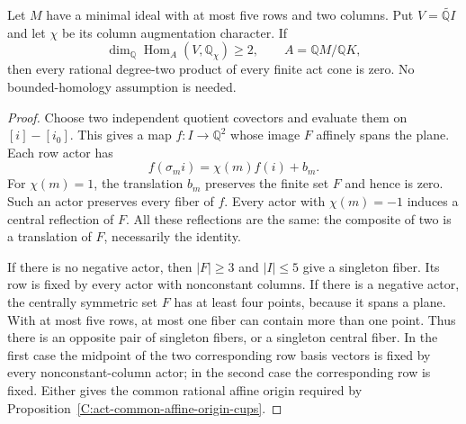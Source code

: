 \begin{lemma}
\label{C:two-covector-affine-origin}
Let $M$ have a minimal ideal with at most five rows and two
columns.  Put $V=\widetilde{\mathbb QI}$ and let $\chi$ be its
column augmentation character.  If
\[
 \dim_{\mathbb Q}\operatorname{Hom}_A(V,\mathbb Q_\chi)\geq2,
 \qquad A=\mathbb QM/\mathbb QK,
\]
then every rational degree-two product of every finite act
cone is zero.  No bounded-homology assumption is needed.
\end{lemma}
\begin{proof}
Choose two independent quotient covectors and evaluate them
on $[i]-[i_0]$.  This gives a map $f:I\to\mathbb Q^2$
whose image $F$ affinely spans the plane.  Each row actor has
\[
 f(\sigma_m i)=\chi(m)f(i)+b_m.
\]
For $\chi(m)=1$, the translation $b_m$ preserves the finite
set $F$ and hence is zero.  Such an actor preserves every
fiber of $f$.  Every actor with $\chi(m)=-1$ induces a central
reflection of $F$.  All these reflections are the same:
the composite of two is a translation of $F$, necessarily
the identity.

If there is no negative actor, then $|F|\geq3$ and $|I|\leq5$
give a singleton fiber.  Its row is fixed by every actor with
nonconstant columns.  If there is a negative actor, the
centrally symmetric set $F$ has at least four points, because
it spans a plane.  With at most five rows, at most one fiber
can contain more than one point.  Thus there is an opposite
pair of singleton fibers, or a singleton central fiber.
In the first case the midpoint of the two corresponding row
basis vectors is fixed by every nonconstant-column actor;
in the second case the corresponding row is fixed.
Either gives the common rational affine origin required by
Proposition~\ref{C:act-common-affine-origin-cups}.
\end{proof}

